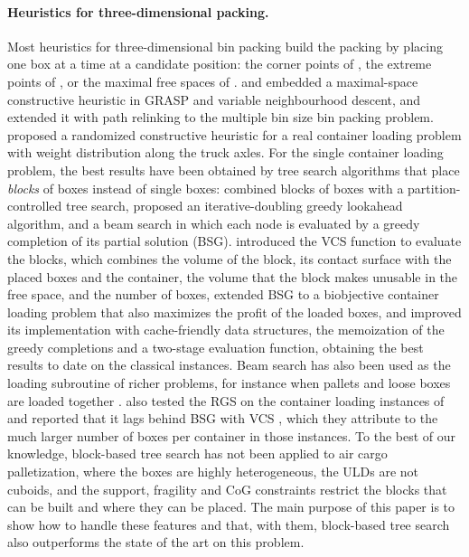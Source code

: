 \paragraph{Heuristics for three-dimensional packing.}
Most heuristics for three-dimensional bin packing build the packing by placing one box at a
time at a candidate position: the corner points of \citet{Martello2000}, the extreme points of
\citet{Crainic2008}, or the maximal free spaces of \citet{Parreno2008}. \citet{Parreno2008} and
\citet{Parreno2010} embedded a maximal-space constructive heuristic in GRASP and variable
neighbourhood descent, and \citet{AlvarezValdes2013} extended it with path relinking to the
multiple bin size bin packing problem. \citet{Gajda2022} proposed a randomized constructive
heuristic for a real container loading problem with weight distribution along the truck axles.
For the single container loading problem, the best results have been obtained by tree search
algorithms that place \emph{blocks} of boxes instead of single boxes:
\citet{Fanslau2010} combined blocks of boxes with a partition-controlled tree search,
\citet{Zhu2012} proposed an iterative-doubling greedy lookahead algorithm, and
\citet{Araya2014} a beam search in which each node is evaluated by a greedy completion of its
partial solution (BSG). \citet{Araya2017} introduced the VCS function to evaluate the blocks,
which combines the volume of the block, its contact surface with the placed boxes and the
container, the volume that the block makes unusable in the free space, and the number of boxes,
\citet{Araya2020} extended BSG to a biobjective container loading problem that also
maximizes the profit of the loaded boxes, and \citet{Guesser2026} improved its implementation
with cache-friendly data structures, the memoization of the greedy completions and a two-stage
evaluation function, obtaining the best results to date on the classical instances. Beam search has also been used
as the loading subroutine of richer problems, for instance when pallets and loose boxes are
loaded together \citep{Tian2024}.
\citet{Hessler2025} also tested the RGS on the container loading instances of
\citet{Bischoff1995} and reported that it lags behind BSG with VCS \citep{Araya2017}, which they
attribute to the much larger number of boxes per container in those instances. To the best of
our knowledge, block-based tree search has not been applied to air cargo palletization, where
the boxes are highly heterogeneous, the ULDs are not cuboids, and the support, fragility and CoG
constraints restrict the blocks that can be built and where they can be placed. The main purpose
of this paper is to show how to handle these features and that, with them, block-based tree
search also outperforms the state of the art on this problem.

